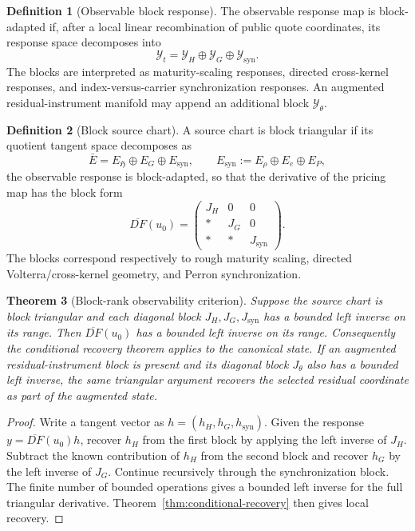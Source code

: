 \documentclass[11pt,a4paper]{amsart}
\theoremstyle{plain}
\newtheorem{theorem}{Theorem}[section]
\theoremstyle{definition}
\newtheorem{definition}[theorem]{Definition}
\theoremstyle{remark}
\newcommand{\cY}{\mathcal{Y}}
\begin{document}
\begin{definition}[Observable block response]\label{def:observable-block-response}
The observable response map is block-adapted if, after a local linear recombination of public
quote coordinates, its response space decomposes into
\[
        \cY_t
        =
        \cY_H\oplus\cY_G\oplus\cY_{\mathrm{syn}} .
\]
The blocks are interpreted as maturity-scaling responses, directed cross-kernel responses, and
index-versus-carrier synchronization responses.  An augmented residual-instrument manifold may
append an additional block \(\cY_\theta\).
\end{definition}

\begin{definition}[Block source chart]\label{def:block-source-chart}
A source chart is block triangular if its quotient tangent space decomposes as
\[
        \bar E
        =
        E_{\mathfrak H}\oplus E_G\oplus E_{\mathrm{syn}},
        \qquad
        E_{\mathrm{syn}}:=E_\rho\oplus E_e\oplus E_P,
\]
the observable response is block-adapted,
so that the derivative of the pricing map has the block form
\[
        \overline{DF}(u_0)
        =
        \begin{pmatrix}
        J_H & 0 & 0\\
        * & J_G & 0\\
        * & * & J_{\mathrm{syn}}
        \end{pmatrix}.
\]
The blocks correspond respectively to rough maturity scaling, directed Volterra/cross-kernel
geometry, and Perron synchronization.
\end{definition}

\begin{theorem}[Block-rank observability criterion]\label{thm:block-rank}
Suppose the source chart is block triangular and each diagonal block
\(J_H,J_G,J_{\mathrm{syn}}\) has a bounded left inverse on its range.  Then
\(\overline{DF}(u_0)\) has a bounded left inverse on its range.  Consequently the conditional
recovery theorem applies to the canonical state.  If an augmented residual-instrument block is
present and its diagonal block \(J_\theta\) also has a bounded left inverse, the same triangular
argument recovers the selected residual coordinate as part of the augmented state.
\end{theorem}

\begin{proof}
Write a tangent vector as \(h=(h_H,h_G,h_{\mathrm{syn}})\).  Given the response
\(y=\overline{DF}(u_0)h\), recover \(h_H\) from the first block by applying the left inverse of
\(J_H\).  Subtract the known contribution of \(h_H\) from the second block and recover \(h_G\) by
the left inverse of \(J_G\).  Continue recursively through the synchronization block.  The finite
number of bounded operations gives a bounded left inverse
for the full triangular derivative.  Theorem~\ref{thm:conditional-recovery} then gives local
recovery.
\end{proof}
\end{document}
